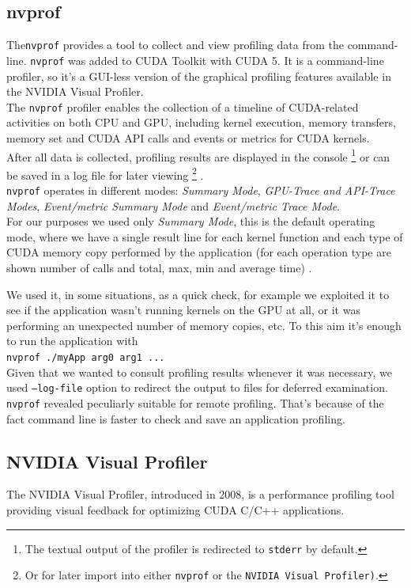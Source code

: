 	\subsection{nvprof}
	The\texttt{nvprof} provides a tool to collect and view profiling data from the command-line.
	\texttt{nvprof} was added to CUDA Toolkit with CUDA 5. It is a command-line profiler, so it's a GUI-less version of the graphical profiling features available in the NVIDIA Visual Profiler.\\
	The \texttt{nvprof} profiler enables the collection of a timeline of CUDA-related activities on both CPU and GPU, including kernel execution, memory transfers, memory set and CUDA API calls and events or metrics for CUDA kernels.\\
	After all data is collected, profiling results are displayed in the console \footnote{The textual output of the profiler is redirected to \texttt{stderr} by default.} or can be saved in a log file for later viewing \footnote{Or for later import into either \texttt{nvprof} or the \texttt{NVIDIA Visual Profiler)}.} \cite{profilersguide, nvprofarticle}.\\
	\texttt{nvprof} operates in different modes: \textit{Summary Mode}, \textit{GPU-Trace and API-Trace Modes}, \textit{Event/metric Summary Mode} and  \textit{Event/metric Trace Mode}.\\	
	For our purposes we used only \textit{Summary Mode}, this is the default operating mode, where we have a single result line for each kernel function and each type of CUDA memory copy performed by the application (for each operation type are shown number of calls and total, max, min and average time) \cite{profilersguide}.
	
	We used it, in some situations, as a quick check, for example we exploited it to see if the application wasn't running kernels on the GPU at all, or it was performing an unexpected number of memory copies, etc.
	To this aim it's enough to run the application with\\
	\texttt{nvprof ./myApp arg0 arg1 ...}\\
	Given that we wanted to consult profiling results whenever it was necessary, we used \texttt{--log-file} option to redirect the output to files for deferred examination. \\
	\texttt{nvprof} revealed peculiarly suitable for remote profiling. That's because of the fact command line is faster to check and save an application profiling.
	  
	\subsection{NVIDIA Visual Profiler}
	The NVIDIA Visual Profiler, introduced in 2008, is a performance profiling tool providing visual feedback for optimizing CUDA C/C++ applications.
	
